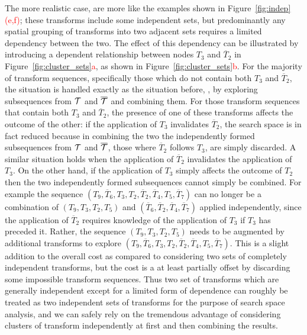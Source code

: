 The more realistic case, are more like the examples shown in Figure~\ref{fig:indep}\textcolor{red}{(e,f)}; these transforms include some independent sets, but predominantly any spatial grouping of transforms into two adjacent sets requires a limited dependency between the two. The effect of this dependency can be illustrated by introducing a dependent relationship between nodes $T_3$ and $\overline{T}_2$ in Figure~\ref{fig:cluster_sets}\textcolor{red}{a}, as shown in Figure~\ref{fig:cluster_sets}\textcolor{red}{b}. For the majority of transform sequences, specifically those which do not contain both $T_3$ and $\overline{T}_2$, the situation is handled exactly as the situation before, \ie, by exploring subsequences from ${\cal T}$ and $\overline{\cal T}$ and combining them. For those transform sequences that contain both $T_3$ and $\overline{T}_2$, the presence of one of these transforms affects the outcome of the other: if the application of $T_3$ invalidates $\overline{T}_2$, the search space is in fact reduced because in combining the two the independently formed subsequences from ${\cal T}$ and $\overline{\cal T}$, those where $\overline{T}_2$ follows $T_3$, are simply discarded. A similar situation holds when the application of $\overline{T}_2$ invalidates the application of $T_3$. On the other hand, if the application of $T_3$ simply affects the outcome of $T_2$ then the two independently formed subsequences cannot simply be combined. For example the sequence $(T_9,\overline{T}_6,T_3,T_2,\overline{T}_2,\overline{T}_4,T_5,\overline{T}_7)$ can no longer be a combination of $(T_9,T_3,T_2,T_5)$ and $(\overline{T}_6,\overline{T}_2,\overline{T}_4,\overline{T}_7)$ applied independently, since the application of $\overline{T}_2$ requires knowledge of the application of $T_3$ if $T_3$ has preceded it. Rather, the sequence  $(T_9,T_3,T_2,T_5)$ needs to be augmented by additional transforms to explore $(T_9,\overline{T}_6,T_3,T_2,\overline{T}_2,\overline{T}_4,T_5,\overline{T}_7)$. This is a slight addition to the overall cost as compared to considering two sets of completely independent transforms, but the cost is a at least partially offset by discarding some impossible transform sequences. Thus two set of transforms which are generally independent except for a limited form of dependence can roughly be treated as two independent sets of transforms for the purpose of search space analysis, and we can safely rely on the tremendous advantage of considering clusters of transform independently at first and then combining the results. 

